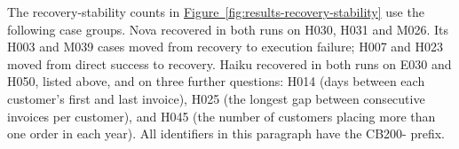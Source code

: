 The recovery-stability counts in
\hyperref[fig:results-recovery-stability]{Figure~\ref*{fig:results-recovery-stability}}
use the following case groups. Nova recovered in both runs on H030, H031 and
M026. Its H003 and M039 cases moved from recovery to execution failure;
H007 and H023 moved from direct success to recovery.
Haiku recovered in both runs on E030 and H050, listed above, and on three
further questions: H014 (days between each customer's first and last invoice),
H025 (the longest gap between consecutive invoices per customer), and
H045 (the number of customers placing more than one order in each year).
All identifiers in this paragraph have the CB200- prefix.
